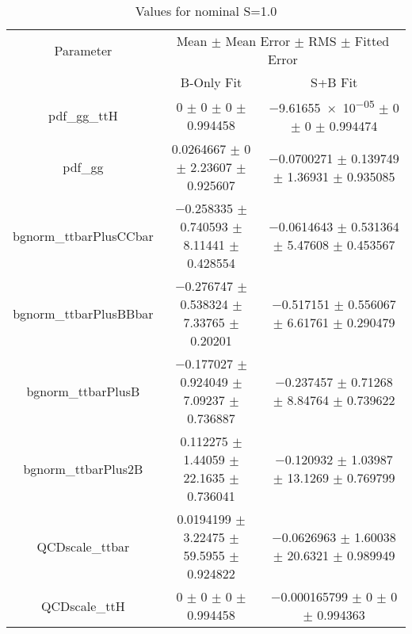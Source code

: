 \begin{table}
\centering
\caption{Values for nominal S=1.0}
\begin{tabular}{ccc}
\toprule
Parameter & \multicolumn{2}{c}{Mean $\pm$ Mean Error $\pm$ RMS $\pm$ Fitted Error}\\
 & B-Only Fit & S+B Fit\\
\midrule
pdf\_gg\_ttH & \num{0} $\pm$ \num{0} $\pm$ \num{0} $\pm$ \num{0.994458} & \num{-9.61655e-05} $\pm$ \num{0} $\pm$ \num{0} $\pm$ \num{0.994474}\\
pdf\_gg & \num{0.0264667} $\pm$ \num{0} $\pm$ \num{2.23607} $\pm$ \num{0.925607} & \num{-0.0700271} $\pm$ \num{0.139749} $\pm$ \num{1.36931} $\pm$ \num{0.935085}\\
bgnorm\_ttbarPlusCCbar & \num{-0.258335} $\pm$ \num{0.740593} $\pm$ \num{8.11441} $\pm$ \num{0.428554} & \num{-0.0614643} $\pm$ \num{0.531364} $\pm$ \num{5.47608} $\pm$ \num{0.453567}\\
bgnorm\_ttbarPlusBBbar & \num{-0.276747} $\pm$ \num{0.538324} $\pm$ \num{7.33765} $\pm$ \num{0.20201} & \num{-0.517151} $\pm$ \num{0.556067} $\pm$ \num{6.61761} $\pm$ \num{0.290479}\\
bgnorm\_ttbarPlusB & \num{-0.177027} $\pm$ \num{0.924049} $\pm$ \num{7.09237} $\pm$ \num{0.736887} & \num{-0.237457} $\pm$ \num{0.71268} $\pm$ \num{8.84764} $\pm$ \num{0.739622}\\
bgnorm\_ttbarPlus2B & \num{0.112275} $\pm$ \num{1.44059} $\pm$ \num{22.1635} $\pm$ \num{0.736041} & \num{-0.120932} $\pm$ \num{1.03987} $\pm$ \num{13.1269} $\pm$ \num{0.769799}\\
QCDscale\_ttbar & \num{0.0194199} $\pm$ \num{3.22475} $\pm$ \num{59.5955} $\pm$ \num{0.924822} & \num{-0.0626963} $\pm$ \num{1.60038} $\pm$ \num{20.6321} $\pm$ \num{0.989949}\\
QCDscale\_ttH & \num{0} $\pm$ \num{0} $\pm$ \num{0} $\pm$ \num{0.994458} & \num{-0.000165799} $\pm$ \num{0} $\pm$ \num{0} $\pm$ \num{0.994363}\\
\bottomrule
\end{tabular}
\end{table}